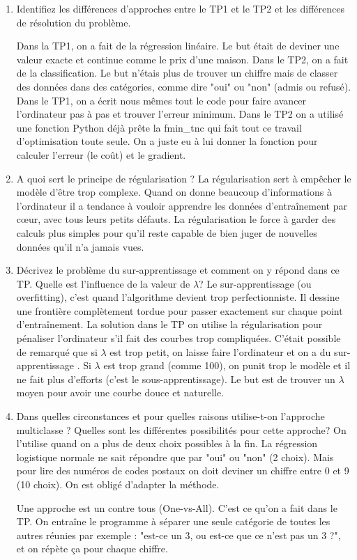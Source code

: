 \begin{enumerate}
    \item Identifiez les différences d’approches entre le TP1 et le TP2 et les différences de résolution du
problème.

    \subitem Dans la TP1, on a fait de la régression linéaire. Le but était de deviner une valeur exacte et continue comme le prix d'une maison. Dans le TP2, on a fait de la classification. Le but n'étais plus de trouver un chiffre mais de classer des données dans des catégories, comme dire "oui" ou "non" (admis ou refusé).
Dans le TP1, on a écrit nous mêmes tout le code pour faire avancer l'ordinateur pas à pas et trouver l'erreur minimum. Dans le TP2 on a utilisé une fonction Python déjà prête la fmin\_tnc qui fait tout ce travail d'optimisation toute seule. On a juste eu à lui donner la fonction pour calculer l'erreur (le coût) et le gradient.

    \item A quoi sert le principe de régularisation ?
    \subitem La régularisation sert à empêcher le modèle d'être trop complexe. Quand on donne beaucoup d'informations à l'ordinateur il a tendance à vouloir apprendre les données d'entraînement par cœur, avec tous leurs petits défauts. La régularisation le force à garder des calculs plus simples pour qu'il reste capable de bien juger de nouvelles données qu'il n'a jamais vues.

     \item Décrivez le problème du sur-apprentissage et comment on y répond dans ce TP. Quelle est l’influence
de la valeur de $\lambda$?
    \subitem Le sur-apprentissage (ou overfitting), c'est quand l'algorithme devient trop perfectionniste. Il dessine une frontière complètement tordue pour passer exactement sur chaque point d'entraînement.
                La solution dans le TP on utilise la régularisation pour pénaliser l'ordinateur s'il fait des courbes trop compliquées. C'était possible de remarqué que si $\lambda$ est trop petit, on laisse faire l'ordinateur et on a du sur-apprentissage . Si $\lambda$ est trop grand (comme 100), on punit trop le modèle et il ne fait plus d'efforts (c'est le sous-apprentissage). Le but est de trouver un $\lambda$ moyen pour avoir une courbe douce et naturelle.

    \item Dans quelles circonstances et pour quelles raisons utilise-t-on l’approche multiclasse ? Quelles sont
les différentes possibilités pour cette approche?
    \subitem On l'utilise quand on a plus de deux choix possibles à la fin. La régression logistique normale ne sait répondre que par "oui" ou "non" (2 choix). Mais pour lire des numéros de codes postaux on doit deviner un chiffre entre 0 et 9 (10 choix). On est obligé d'adapter la méthode.
            
    Une approche est un contre tous (One-vs-All). C'est ce qu'on a fait dans le TP. On entraîne le programme à séparer une seule catégorie de toutes les autres réunies par exemple : "est-ce un 3, ou est-ce que ce n'est pas un 3 ?", et on répète ça pour chaque chiffre.
\end{enumerate}